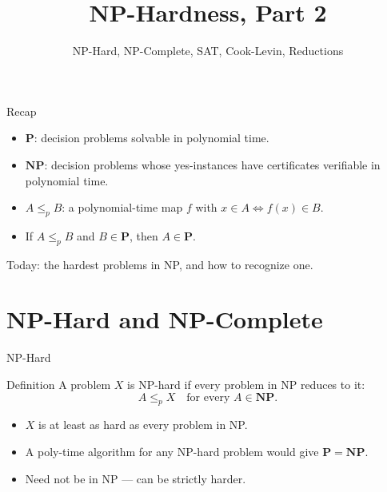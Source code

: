 \documentclass[10pt,aspectratio=169]{beamer}
\title{NP-Hardness, Part 2}
\subtitle{NP-Hard, NP-Complete, SAT, Cook-Levin, Reductions}
\date{}
\author{}
\begin{document}
\maketitle

\begin{frame}{Recap}
  \begin{itemize}
    \item $\mathbf{P}$: decision problems \alert{solvable} in polynomial
          time.
    \item $\mathbf{NP}$: decision problems whose yes-instances have
          certificates \alert{verifiable} in polynomial time.
    \item $A \le_p B$: a polynomial-time map $f$ with
          $x \in A \iff f(x) \in B$.
    \item If $A \le_p B$ and $B \in \mathbf{P}$, then $A \in \mathbf{P}$.
  \end{itemize}

  \bigskip
  Today: the \alert{hardest} problems in NP, and how to recognize one.
\end{frame}

\section{NP-Hard and NP-Complete}

\begin{frame}{NP-Hard}
  \begin{block}{Definition}
    A problem $X$ is \alert{NP-hard} if every problem in NP reduces to it:
    \[
      A \le_p X \quad \text{for every } A \in \mathbf{NP}.
    \]
  \end{block}

  \begin{itemize}
    \item $X$ is at least as hard as every problem in NP.
    \item A poly-time algorithm for any NP-hard problem would give
          $\mathbf{P} = \mathbf{NP}$.
    \item Need not be in NP — can be strictly harder.
  \end{itemize}
\end{frame}
\end{document}

